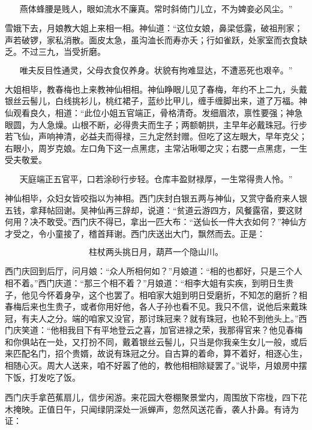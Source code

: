 \[
燕体蜂腰是贱人，眼如流水不廉真。
常时斜倚门儿立，不为婢妾必风尘。”
\]

雪娥下去，月娘教大姐上来相一相。神仙道：“这位女娘，鼻梁低露，破祖刑家；声若破锣，家私消散。面皮太急，虽沟洫长而寿亦夭；行如雀跃，处家室而衣食缺乏。不过三九，当受折磨。

\[
唯夫反目性通灵，父母衣食仅养身。
状貌有拘难显达，不遭恶死也艰辛。”
\]

大姐相毕，教春梅也上来教神仙相相。神仙睁眼儿见了春梅，年约不上二九，头戴银丝云髻儿，白线挑衫儿，桃红裙子，蓝纱比甲儿，缠手缠脚出来，道了万福。神仙观看良久，相道：“此位小姐五官端正，骨格清奇。发细眉浓，禀性要强；神急眼圆，为人急燥。山根不断，必得贵夫而生子；两额朝拱，主早年必戴珠冠。行步若飞仙，声响神清，必益夫而得禄，三九定然封赠。但吃了这左眼大，早年克父；右眼小，周岁克娘。左口角下这一点黑痣，主常沾啾唧之灾；右腮一点黑痣，一生受夫敬爱。

\[
天庭端正五官平，口若涂砂行步轻。
仓库丰盈财禄厚，一生常得贵人怜。”
\]

神仙相毕，众妇女皆咬指以为神相。西门庆封白银五两与神仙，又赏守备府来人银五钱，拿拜帖回谢。吴神仙再三辞却，说道：“贫道云游四方，风餐露宿，要这财何用？决不敢受。”西门庆不得已，拿出一匹大布：“送仙长一件大衣如何？”神仙方才受之，令小童接了，稽首拜谢。西门庆送出大门，飘然而去。正是：

\[
柱杖两头挑日月，葫芦一个隐山川。
\]

西门庆回到后厅，问月娘：“众人所相何如？”月娘道：“相的也都好，只是三个人相不着。”西门庆道：“那三个相不着？”月娘道：“相李大姐有实疾，到明日生贵子，他见今怀着身孕，这个也罢了。相咱家大姐到明日受磨折，不知怎的磨折？相春梅后来也生贵子，或者你用好他，各人子孙也看不见。我只不信，说他后来戴珠冠，有夫人之分。端的咱家又没官，那讨珠冠来？就有珠冠，也轮不到他头上。”西门庆笑道：“他相我目下有平地登云之喜，加官进禄之荣，我那得官来？他见春梅和你俱站在一处，又打扮不同，戴着银丝云髻儿，只当是你我亲生女儿一般，或后来匹配名门，招个贵婿，故说有珠冠之分。自古算的着命，算不着好，相逐心生，相随心灭。周大人送来，咱不好嚣了他的，教他相相除疑罢了。”说毕，月娘房中摆下饭，打发吃了饭。

西门庆手拿芭蕉扇儿，信步闲游。来花园大卷棚聚景堂内，周围放下帘栊，四下花木掩映。正值日午，只闻绿阴深处一派蝉声，忽然风送花香，袭人扑鼻。有诗为证：

